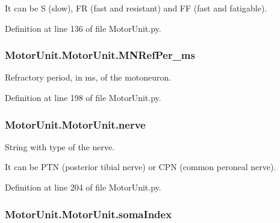 It can be S (slow), F\-R (fast and resistant) and F\-F (fast and fatigable). 

Definition at line 136 of file Motor\-Unit.\-py.

\hypertarget{class_motor_unit_1_1_motor_unit_abbdaa195ac00926d96d509ae01dcda05}{
\subsubsection[{M\-N\-Ref\-Per\-\_\-ms}]{\setlength{\rightskip}{0pt plus 5cm}Motor\-Unit.\-Motor\-Unit.\-M\-N\-Ref\-Per\-\_\-ms}}\label{class_motor_unit_1_1_motor_unit_abbdaa195ac00926d96d509ae01dcda05}


Refractory period, in ms, of the motoneuron. 



Definition at line 198 of file Motor\-Unit.\-py.

\hypertarget{class_motor_unit_1_1_motor_unit_a754ee6b88fc2a09899da9f9b13bfbf59}{
\subsubsection[{nerve}]{\setlength{\rightskip}{0pt plus 5cm}Motor\-Unit.\-Motor\-Unit.\-nerve}}\label{class_motor_unit_1_1_motor_unit_a754ee6b88fc2a09899da9f9b13bfbf59}


String with type of the nerve. 

It can be P\-T\-N (posterior tibial nerve) or C\-P\-N (common peroneal nerve). 

Definition at line 204 of file Motor\-Unit.\-py.

\hypertarget{class_motor_unit_1_1_motor_unit_a7cd2be92814b5892bdd18dafd824da9f}{
\subsubsection[{soma\-Index}]{\setlength{\rightskip}{0pt plus 5cm}Motor\-Unit.\-Motor\-Unit.\-soma\-Index}}\label{class_motor_unit_1_1_motor_unit_a7cd2be92814b5892bdd18dafd824da9f}


